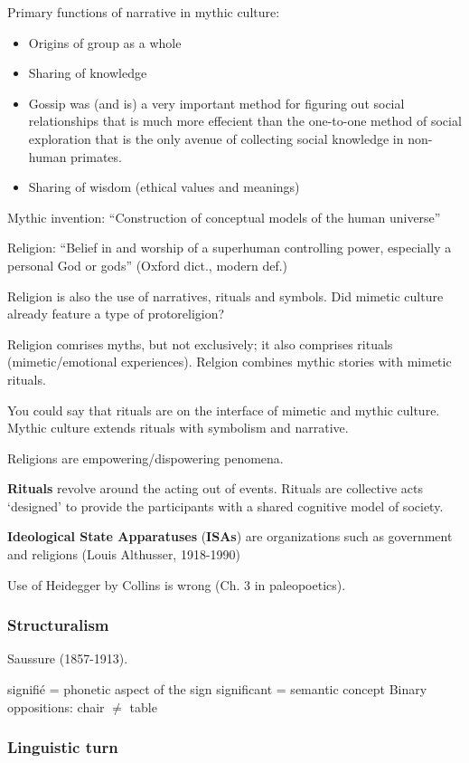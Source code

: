 \documentclass{article}
\begin{document}
Primary functions of narrative in mythic culture: 
\begin{itemize}
  \item Origins of group as a whole
  \item Sharing of knowledge
  \item Gossip was (and is) a very important method for figuring out social relationships that is much more effecient than the one-to-one method of social exploration that is the only avenue of collecting social knowledge in non-human primates.
  \item Sharing of wisdom (ethical values and meanings)
\end{itemize}
Mythic invention: “Construction of conceptual models of the human universe”

Religion: “Belief in and worship of a superhuman controlling power, especially a personal God or gods” (Oxford dict., modern def.)

Religion is also the use of narratives, rituals and symbols. Did mimetic culture already feature a type of protoreligion?

Religion comrises myths, but not exclusively; it also comprises rituals (mimetic/emotional experiences).
Relgion combines mythic stories with mimetic rituals.

You could say that rituals are on the interface of mimetic and mythic culture. Mythic culture extends rituals with symbolism and narrative.

Religions are empowering/dispowering penomena.

\textbf{Rituals} revolve around the acting out of events. Rituals are collective acts ‘designed’ to provide the participants with a shared cognitive model of society. 

\textbf{Ideological State Apparatuses} (\textbf{ISAs}) are organizations such as government and religions (Louis Althusser, 1918-1990)

Use of Heidegger by Collins is wrong (Ch. 3 in paleopoetics).

\subsubsection{Structuralism}

Saussure (1857-1913).

signifi\'{e} = phonetic aspect of the sign
significant = semantic concept
Binary oppositions: chair $\ne$ table

\subsubsection{Linguistic turn}
\end{document}
